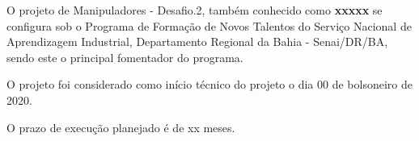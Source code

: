 \documentclass[
12pt,					%
openright,				%
twoside,				%
a4paper,				%
english,
brazil
]{ABNT/abntex2_report}
\begin{document}
	\frenchspacing
	\imprimircapa
	\imprimircatalografica
	\ABNTEXchapterfont\large\textbf{\execsummarytitlename}
	\begin{flushleft}
		\normalsize
		\justify
		\normalfont
		O projeto de Manipuladores - Desafio.2, também conhecido como \textbf{xxxxx} se configura sob o Programa de Formação de Novos Talentos do Serviço Nacional de Aprendizagem Industrial, Departamento Regional da Bahia - Senai/DR/BA, sendo este o principal fomentador do programa.

		O projeto foi considerado como início técnico do projeto o dia 00 de bolsoneiro de 2020. 

		O prazo de execução planejado é de xx meses.
	\end{flushleft}
	\clearpage
	\ABNTEXchapterfont\large\textbf{\resumoatitlename}
	\begin{flushleft}
		\normalsize
		\justify
		\normalfont
	\end{flushleft}
	\vspace*{1cm}
	\newpage
	\ABNTEXchapterfont\large\textbf{\resumobtitlename}
	\begin{flushleft}
		\normalsize
		\justify
		\normalfont
	\end{flushleft}
	\clearpage
	\begin{flushleft}
		\ABNTEXchapterfont\Large\textbf{\MakeUppercase\listadefigurasname}
	\end{flushleft}
	\vspace*{-36pt}
	\pdfbookmark[0]{\listfigurename}{lof}
	\normalsize
	\listoffigures*
	\cleardoublepage
	\begin{flushleft}
		\ABNTEXchapterfont\Large\textbf{\MakeUppercase\listadetabelasname}
	\end{flushleft}
	\vspace*{-36pt}
	\pdfbookmark[0]{\listtablename}{lot}
	\normalsize
	\listoftables*
	\cleardoublepage
\end{document}
